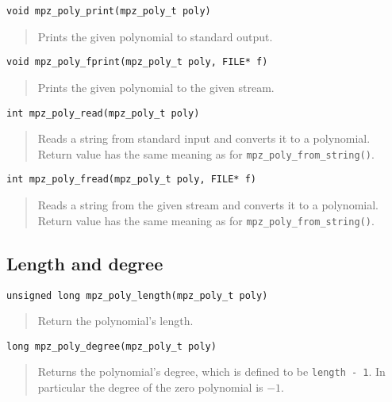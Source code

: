 \documentclass[a4paper,10pt]{article}
\newcommand{\code}{\lstinline}
\begin{document}
\begin{lstlisting}
void mpz_poly_print(mpz_poly_t poly)
\end{lstlisting}
\begin{quote}
Prints the given polynomial to standard output.
\end{quote}

\begin{lstlisting}
void mpz_poly_fprint(mpz_poly_t poly, FILE* f)
\end{lstlisting}
\begin{quote}
Prints the given polynomial to the given stream.
\end{quote}

\begin{lstlisting}
int mpz_poly_read(mpz_poly_t poly)
\end{lstlisting}
\begin{quote}
Reads a string from standard input and converts it to a polynomial. Return value has the same meaning as for \code{mpz_poly_from_string()}.
\end{quote}

\begin{lstlisting}
int mpz_poly_fread(mpz_poly_t poly, FILE* f)
\end{lstlisting}
\begin{quote}
Reads a string from the given stream and converts it to a polynomial. Return value has the same meaning as for \code{mpz_poly_from_string()}.
\end{quote}


\subsection{Length and degree}

\begin{lstlisting}
unsigned long mpz_poly_length(mpz_poly_t poly)
\end{lstlisting}
\begin{quote}
Return the polynomial's length.
\end{quote}

\begin{lstlisting}
long mpz_poly_degree(mpz_poly_t poly)
\end{lstlisting}
\begin{quote}
Returns the polynomial's degree, which is defined to be \code{length - 1}. In particular the degree of the zero polynomial is $-1$.
\end{quote}
\end{document}
